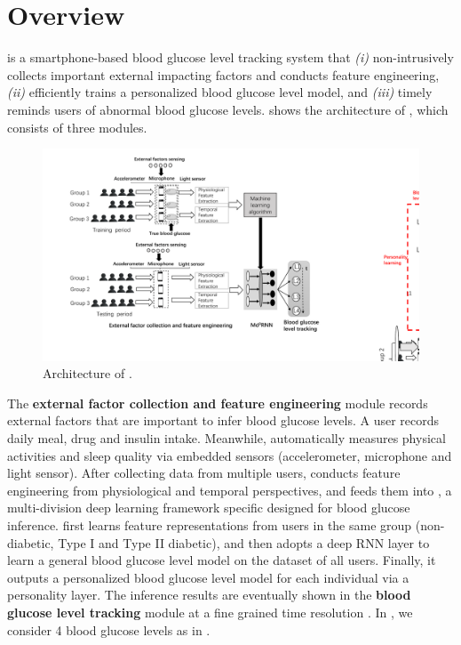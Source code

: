 
\section{Overview}
\label{sec:overview}
\sysname is a smartphone-based blood glucose level tracking system that \emph{(i)} non-intrusively collects important external impacting factors and conducts feature engineering, \emph{(ii)} efficiently trains a personalized blood glucose level model, and \emph{(iii)} timely reminds users of abnormal blood glucose levels.
 shows the architecture of \sysname, which consists of three modules.

\begin{figure}[h]
  \centering
  \includegraphics[width=0.8\columnwidth]{./img/System_Arch2.pdf}
  \caption{Architecture of \sysname.}
  \label{fig:architecture}
\end{figure}

The \textbf{external factor collection and feature engineering} module records external factors that are important to infer blood glucose levels.
A user records daily meal, drug and insulin intake.
Meanwhile, \sysname automatically measures physical activities and sleep quality via embedded sensors (\ie accelerometer, microphone and light sensor).
After collecting data from multiple users, \sysname conducts feature engineering from physiological and temporal perspectives, and feeds them into \textbf{\modelname}, a multi-division deep learning framework specific designed for blood glucose inference.
\modelname first learns feature representations from users in the same group (non-diabetic, Type I and Type II diabetic), and then adopts a deep RNN layer to learn a general blood glucose level model on the dataset of all users.
Finally, it outputs a personalized blood glucose level model for each individual via a personality layer. 
The inference results are eventually shown in the \textbf{blood glucose level tracking} module at a fine grained time resolution .
In \sysname, we consider 4 blood glucose levels as in .

